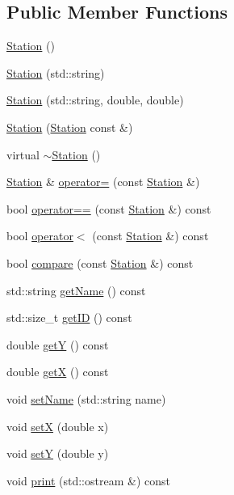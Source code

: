 \subsection*{Public Member Functions}
\begin{DoxyCompactItemize}
\item 
\mbox{\hyperlink{classanen_sta_1_1_station_afb64bb9d68c519a693cd10af5d783873}{Station}} ()
\item 
\mbox{\hyperlink{classanen_sta_1_1_station_a388a35801b1bc978ac07f7a27ffcbfad}{Station}} (std\+::string)
\item 
\mbox{\hyperlink{classanen_sta_1_1_station_a1ebec6ab0f696fcbe3b2fdabf0e08410}{Station}} (std\+::string, double, double)
\item 
\mbox{\hyperlink{classanen_sta_1_1_station_abe94af374abbb791cfe572a2b165f10d}{Station}} (\mbox{\hyperlink{classanen_sta_1_1_station}{Station}} const \&)
\item 
virtual \mbox{\hyperlink{classanen_sta_1_1_station_a2825593117f648d73ea9cbaf851d709d}{$\sim$\+Station}} ()
\item 
\mbox{\hyperlink{classanen_sta_1_1_station}{Station}} \& \mbox{\hyperlink{classanen_sta_1_1_station_aefbe0460eb39098b3e1ed4b085ecefab}{operator=}} (const \mbox{\hyperlink{classanen_sta_1_1_station}{Station}} \&)
\item 
bool \mbox{\hyperlink{classanen_sta_1_1_station_a402c117d0cff0994d195c2b7027f57c6}{operator==}} (const \mbox{\hyperlink{classanen_sta_1_1_station}{Station}} \&) const
\item 
bool \mbox{\hyperlink{classanen_sta_1_1_station_ae75bae686937d9b5fc9b75ca7f6133fc}{operator$<$}} (const \mbox{\hyperlink{classanen_sta_1_1_station}{Station}} \&) const
\item 
bool \mbox{\hyperlink{classanen_sta_1_1_station_a071a6c089a2c00a61606d7b4e2766194}{compare}} (const \mbox{\hyperlink{classanen_sta_1_1_station}{Station}} \&) const
\item 
std\+::string \mbox{\hyperlink{classanen_sta_1_1_station_a85b26a617e15c4d516e06169c9fb9e50}{get\+Name}} () const
\item 
std\+::size\+\_\+t \mbox{\hyperlink{classanen_sta_1_1_station_a7da5e30ee0d25653333630aa61ca5257}{get\+ID}} () const
\item 
double \mbox{\hyperlink{classanen_sta_1_1_station_adefc7f1b643ef4542580fd05fbf96b60}{getY}} () const
\item 
double \mbox{\hyperlink{classanen_sta_1_1_station_a8f4b152659b571ef4d14159527d2037d}{getX}} () const
\item 
void \mbox{\hyperlink{classanen_sta_1_1_station_a8e124bea828292a973ccdfa8aff399cb}{set\+Name}} (std\+::string name)
\item 
void \mbox{\hyperlink{classanen_sta_1_1_station_aad174c1e68a7e008a81c1c7decd21064}{setX}} (double x)
\item 
void \mbox{\hyperlink{classanen_sta_1_1_station_afd21b8c9a5ebdf6f0423e95cf77daebb}{setY}} (double y)
\item 
void \mbox{\hyperlink{classanen_sta_1_1_station_a463e83848b188691dc554003b995ae6d}{print}} (std\+::ostream \&) const
\end{DoxyCompactItemize}

